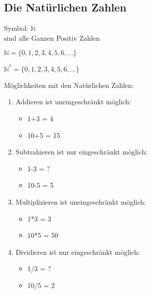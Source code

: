 \subsection{Die Natürlichen Zahlen}
Symbol: $\mathbb{N}$\\
sind alle Ganzen Positiv Zahlen

\hfill \break
\hfill \break
$ \mathbb{N}=\{0,1,2,3,4,5,6,\ldots\} $

\hfill \break
$ \mathbb{N}^{*}=\{0,1,2,3,4,5,6,\ldots\} $

\hfill \break
{}

\hfill \break
Möglichkeiten mit den Natürlichen Zahlen:
\begin{enumerate}
    \item Addieren ist uneingeschränkt möglich:
          \begin{itemize}
              \item 1+3 = 4
              \item 10+5 = 15
          \end{itemize}
    \item Subtrahieren ist nur eingeschränkt möglich:
          \begin{itemize}
              \item 1-3 = ?
              \item 10-5 = 5
          \end{itemize}
    \item Multiplizieren ist uneingeschränkt möglich:
          \begin{itemize}
              \item 1*3 = 3
              \item 10*5 = 50
          \end{itemize}
    \item Dividieren ist nur eingeschränkt möglich:
          \begin{itemize}
              \item 1/3 = ?
              \item 10/5 = 2
          \end{itemize}
\end{enumerate}